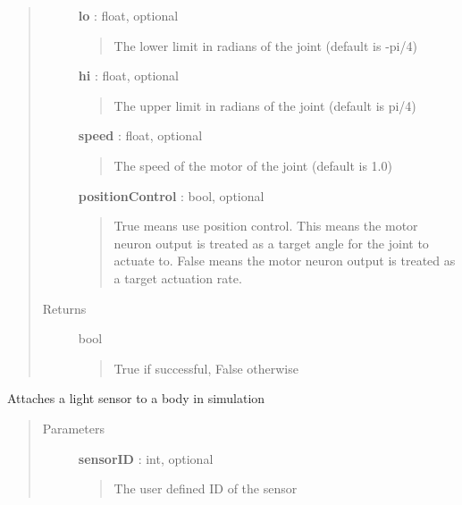\documentclass[letterpaper,10pt,english]{sphinxmanual}
\begin{document}
\begin{fulllineitems}
\begin{fulllineitems}
\begin{quote}
\begin{description}
\textbf{lo} : float, optional
\begin{quote}

The lower limit in radians of the joint (default is -pi/4)
\end{quote}

\textbf{hi} : float, optional
\begin{quote}

The upper limit in radians of the joint (default is pi/4)
\end{quote}

\textbf{speed} : float, optional
\begin{quote}

The speed of the motor of the joint (default is 1.0)
\end{quote}

\textbf{positionControl} : bool, optional
\begin{quote}

True means use position control. This means the motor neuron
output is treated as a target angle for the joint to actuate
to. False means the motor neuron output is treated as a target
actuation rate.
\end{quote}

\item[{Returns}] \leavevmode
bool
\begin{quote}

True if successful, False otherwise
\end{quote}

\end{description}\end{quote}

\end{fulllineitems}


\begin{fulllineitems}
\label{code:pyrosim.PYROSIM.Send_Light_Sensor}
Attaches a light sensor to a body in simulation
\begin{quote}\begin{description}
\item[{Parameters}] \leavevmode
\textbf{sensorID} : int, optional
\begin{quote}

The user defined ID of the sensor
\end{quote}


\end{description}
\end{quote}
\end{fulllineitems}
\end{fulllineitems}
\end{document}
